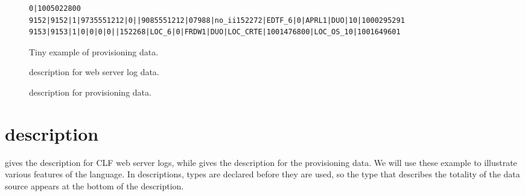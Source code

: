 \begin{figure*}[t!]
\end{figure*}

\begin{figure*}
\begin{small}
\begin{center}
\begin{verbatim}
0|1005022800
9152|9152|1|9735551212|0||9085551212|07988|no_ii152272|EDTF_6|0|APRL1|DUO|10|1000295291
9153|9153|1|0|0|0|0||152268|LOC_6|0|FRDW1|DUO|LOC_CRTE|1001476800|LOC_OS_10|1001649601
\end{verbatim}
\caption{Tiny example of \dibbler{} provisioning data.}
\label{figure:dibbler-records}
\end{center}
\end{small}
\end{figure*}

\begin{figure}
\begin{tiny}

\caption{\pads{} description for web server log data.}
\label{figure:wsl}
\end{tiny}
\end{figure}

\begin{figure}
\begin{footnotesize}

\caption{\pads{} description for \dibbler{} provisioning data.}
\label{figure:dibbler}
\end{footnotesize}
\end{figure}



\section{\padsl{} description}
\label{sec:example:padsl-description}
 gives the \pads{} description for CLF web server
logs,  while  gives the description for the
\dibbler{} provisioning data.  We will use these example to illustrate
various features of the \pads{} language.  In \pads{} descriptions,
types are declared before they are used, so the type that describes
the totality of the data source appears at the bottom of the
description.

